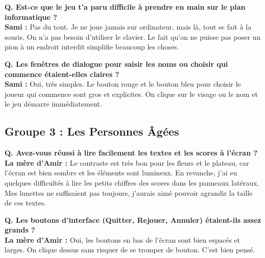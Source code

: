 \documentclass[11pt,a4paper]{article}
\begin{document}
\begin{tcolorbox}[nongamerbox, title={Sami -- 24 ans, infirmier}]
    \textbf{Q. Est-ce que le jeu t'a paru difficile à prendre en main sur le plan informatique ?}\\
    \textbf{Sami :} Pas du tout. Je ne joue jamais sur ordinateur, mais là, tout se fait à la souris. On n'a pas besoin d'utiliser le clavier. Le fait qu'on ne puisse pas poser un pion à un endroit interdit simplifie beaucoup les choses.

    \textbf{Q. Les fenêtres de dialogue pour saisir les noms ou choisir qui commence étaient-elles claires ?}\\
    \textbf{Sami :} Oui, très simples. Le bouton rouge et le bouton bleu pour choisir le joueur qui commence sont gros et explicites. On clique sur le visage ou le nom et le jeu démarre immédiatement.
\end{tcolorbox}

\subsection{Groupe 3 : Les Personnes Âgées}

\begin{tcolorbox}[seniorbox, title={La mère d'Amir -- 66 ans, retraitée de l'enseignement}]
    \textbf{Q. Avez-vous réussi à lire facilement les textes et les scores à l'écran ?}\\
    \textbf{La mère d'Amir :} Le contraste est très bon pour les fleurs et le plateau, car l'écran est bien sombre et les éléments sont lumineux. En revanche, j'ai eu quelques difficultés à lire les petits chiffres des scores dans les panneaux latéraux. Mes lunettes ne suffisaient pas toujours, j'aurais aimé pouvoir agrandir la taille de ces textes.

    \textbf{Q. Les boutons d'interface (Quitter, Rejouer, Annuler) étaient-ils assez grands ?}\\
    \textbf{La mère d'Amir :} Oui, les boutons en bas de l'écran sont bien espacés et larges. On clique dessus sans risquer de se tromper de bouton. C'est bien pensé.
\end{tcolorbox}
\end{document}
